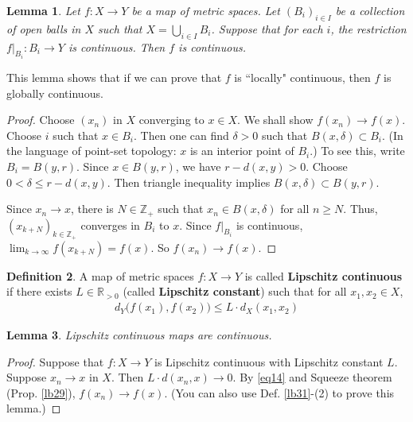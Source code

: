 \documentclass[12pt,b5paper,notitlepage]{article}
\theoremstyle{definition}
\newtheorem{df}{Definition}[section]
\theoremstyle{plain}
\newtheorem{lm}[df]{Lemma}
\newcommand{\Zbb}{\mathbb Z}
\newcommand{\Rbb}{\mathbb R}
\numberwithin{equation}{section}
\begin{document}
\begin{lm}\label{lb30}
Let $f:X\rightarrow Y$ be a map of metric spaces.  Let $(B_i)_{i\in I}$ be a collection of open balls in $X$ such that $X=\bigcup_{i\in I}B_i$. Suppose that for each $i$, the restriction $f|_{B_i}:B_i\rightarrow Y$ is continuous. Then $f$ is continuous. 
\end{lm}

This lemma shows that if we can prove that $f$ is ``locally" continuous, then $f$ is globally continuous. 

\begin{proof}
Choose $(x_n)$ in $X$ converging to $x\in X$. We shall show $f(x_n)\rightarrow f(x)$. Choose $i$ such that $x\in B_i$. Then one can find $\delta>0$ such that $B(x,\delta)\subset B_i$. (In the language of point-set topology: $x$ is an interior point of $B_i$.) To see this, write $B_i=B(y,r)$. Since $x\in B(y,r)$, we have $r-d(x,y)>0$. Choose $0<\delta\leq r-d(x,y)$. Then triangle inequality implies $B(x,\delta)\subset B(y,r)$. 

Since $x_n\rightarrow x$, there is $N\in\Zbb_+$ such that $x_n\in B(x,\delta)$ for all $n\geq N$. Thus, $(x_{k+N})_{k\in\Zbb_+}$ converges in $B_i$ to $x$. Since $f|_{B_i}$ is continuous, $\lim_{k\rightarrow\infty} f(x_{k+N})=f(x)$. So $f(x_n)\rightarrow f(x)$.
\end{proof}







\begin{df}
A map of metric spaces $f:X\rightarrow Y$ is called  \textbf{Lipschitz continuous} if there exists $L\in\Rbb_{>0}$ (called \textbf{Lipschitz constant})  such that for all $x_1,x_2\in X$,
\begin{align}
d_Y\big(f(x_1),f(x_2) \big)\leq L\cdot d_X(x_1,x_2) \label{eq14}
\end{align}
\end{df}

\begin{lm}\label{lb34}
Lipschitz continuous maps are continuous. 
\end{lm}

\begin{proof}
Suppose that $f:X\rightarrow Y$ is Lipschitz continuous with Lipschitz constant $L$. Suppose $x_n\rightarrow x$ in $X$. Then $L\cdot d(x_n,x)\rightarrow 0$. By \eqref{eq14} and Squeeze theorem (Prop. \ref{lb29}), $f(x_n)\rightarrow f(x)$. (You can also use Def. \ref{lb31}-(2) to prove this lemma.)
\end{proof}
\end{document}
